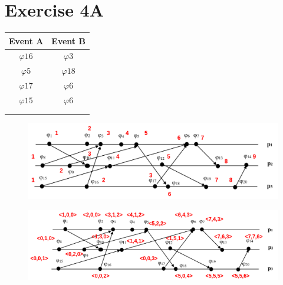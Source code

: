 \section*{Exercise 4A}

\begin{table}[h]
\begin{tabular}{cc}
\hline
\multicolumn{1}{|l|}{\textbf{Event A}} & \multicolumn{1}{l|}{\textbf{Event B}} \\ \hline
\multicolumn{1}{|c|}{$\varphi{16}$}                 & \multicolumn{1}{c|}{$\varphi{3}$}                 \\ \hline
\multicolumn{1}{|c|}{$\varphi{5}$}                  & \multicolumn{1}{c|}{$\varphi{18}$}                 \\ \hline
\multicolumn{1}{|c|}{$\varphi{17}$}                 & \multicolumn{1}{c|}{$\varphi{6}$}                 \\ \hline
\multicolumn{1}{|c|}{$\varphi{15}$}                 & \multicolumn{1}{c|}{$\varphi{6}$}                 \\ \hline
                                       &                                       \\
                                       &                                      
\end{tabular}
\end{table}

\begin{figure}[h]
    \centering
    \includegraphics[width=\textwidth]{fig/4b.png}
\end{figure}


\begin{figure}[h]
    \centering
    \includegraphics[width=\textwidth]{fig/4c.png}
\end{figure}

